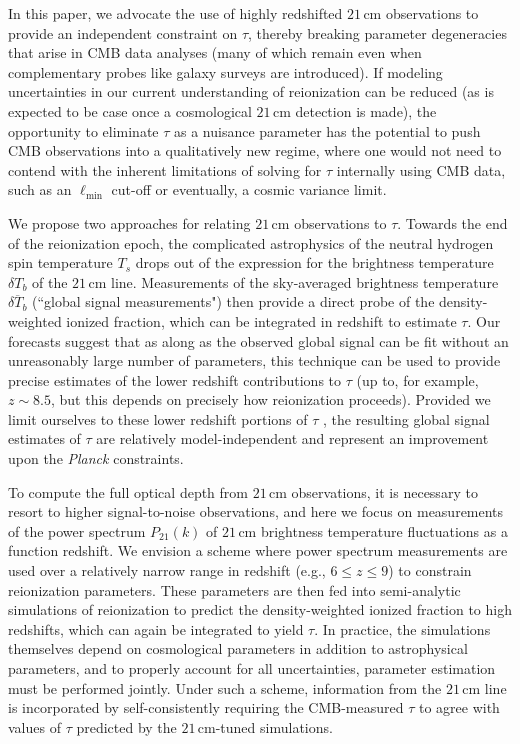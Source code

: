 \documentclass[twocolumn,aps,prd,nofootinbib,showpacs,superscriptaddress]{revtex4-1}
\begin{document}
In this paper, we advocate the use of highly redshifted $21\,\textrm{cm}$ observations to provide an independent constraint on $\tau$, thereby breaking parameter degeneracies that arise in CMB data analyses (many of which remain even when complementary probes like galaxy surveys are introduced). If modeling uncertainties in our current understanding of reionization can be reduced (as is expected to be case once a cosmological $21\,\textrm{cm}$ detection is made), the opportunity to eliminate $\tau$ as a nuisance parameter has the potential to push CMB observations into a qualitatively new regime, where one would not need to contend with the inherent limitations of solving for $\tau$ internally using CMB data, such as an $\ell_\textrm{min}$ cut-off or eventually, a cosmic variance limit.

We propose two approaches for relating $21\,\textrm{cm}$ observations to $\tau$. Towards the end of the reionization epoch, the complicated astrophysics of the neutral hydrogen spin temperature $T_s$ drops out of the expression for the brightness temperature $\delta T_b$ of the $21\,\textrm{cm}$ line. Measurements of the sky-averaged brightness temperature $\overline{\delta T_b}$ (``global signal measurements") then provide a direct probe of the density-weighted ionized fraction, which can be integrated in redshift to estimate $\tau$. Our forecasts suggest that as along as the observed global signal can be fit without an unreasonably large number of parameters, this technique can be used to provide precise estimates of the lower redshift contributions to $\tau$ (up to, for example, $z \sim 8.5$, but this depends on precisely how reionization proceeds). Provided we limit ourselves to these lower redshift portions of $\tau$
, the resulting global signal estimates of $\tau$ are relatively model-independent and represent an improvement upon the \emph{Planck} constraints.

To compute the full optical depth from $21\,\textrm{cm}$ observations, it is necessary to resort to higher signal-to-noise observations, and here we focus on measurements of the power spectrum $P_{21} (k)$ of $21\,\textrm{cm}$ brightness temperature fluctuations as a function redshift. We envision a scheme where power spectrum measurements are used over a relatively narrow range in redshift (e.g., $6 \le z \le 9$) to constrain reionization parameters. These parameters are then fed into semi-analytic simulations of reionization to predict the density-weighted ionized fraction to high redshifts, which can again be integrated to yield $\tau$. In practice, the simulations themselves depend on cosmological parameters in addition to astrophysical parameters, and to properly account for all uncertainties, parameter estimation must be performed jointly. Under such a scheme, information from the $21\,\textrm{cm}$ line is incorporated by self-consistently requiring the CMB-measured $\tau$ to agree with values of $\tau$ predicted by the $21\,\textrm{cm}$-tuned simulations.
\end{document}
